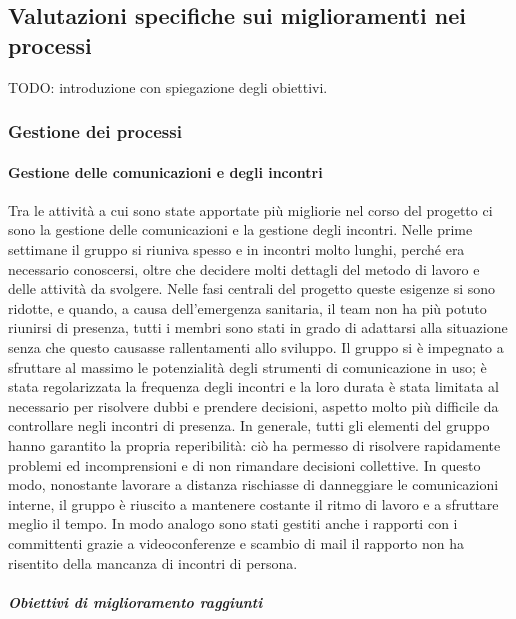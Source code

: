 	\subsection{Valutazioni specifiche sui miglioramenti nei processi}
		TODO: introduzione con spiegazione degli obiettivi.
	
		\subsubsection{Gestione dei processi}
			\paragraph{Gestione delle comunicazioni e degli incontri}
				Tra le attività a cui sono state apportate più migliorie nel corso del progetto ci sono la gestione delle comunicazioni e la gestione degli incontri.
				\newline
				Nelle prime settimane il gruppo si riuniva spesso e in incontri molto lunghi, perché era necessario conoscersi, oltre che decidere molti dettagli del metodo di lavoro e delle attività da svolgere. Nelle fasi centrali del progetto queste esigenze si sono ridotte, e quando, a causa dell'emergenza sanitaria, il team non ha più potuto riunirsi di presenza, tutti i membri sono stati in grado di adattarsi alla situazione senza che questo causasse rallentamenti allo sviluppo. Il gruppo si è impegnato a sfruttare al massimo le potenzialità degli strumenti di comunicazione in uso; è stata regolarizzata la frequenza degli incontri e la loro durata è stata limitata al necessario per risolvere dubbi e prendere decisioni, aspetto molto più difficile da controllare negli incontri di presenza.
				\newline
				In generale, tutti gli elementi del gruppo hanno garantito la propria reperibilità: ciò ha permesso di risolvere rapidamente problemi ed incomprensioni e di non rimandare decisioni collettive. In questo modo, nonostante lavorare a distanza rischiasse di danneggiare le comunicazioni interne, il gruppo è riuscito a mantenere costante il ritmo di lavoro e a sfruttare meglio il tempo. In modo analogo sono stati gestiti anche i rapporti con i committenti grazie a videoconferenze e scambio di mail il rapporto non ha risentito della mancanza di incontri di persona.
				
				\subparagraph{Obiettivi di miglioramento raggiunti}
		

